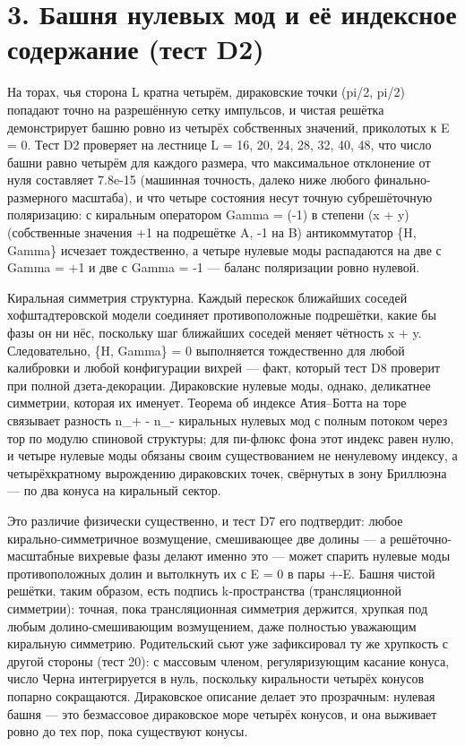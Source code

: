 \documentclass[11pt,a4paper]{article}
\begin{document}
\section{3. Башня нулевых мод и её индексное содержание (тест D2)}
На торах, чья сторона L кратна четырём, дираковские точки (pi/2, pi/2) попадают точно на разрешённую сетку импульсов, и чистая решётка демонстрирует башню ровно из четырёх собственных значений, приколотых к E = 0. Тест D2 проверяет на лестнице L = 16, 20, 24, 28, 32, 40, 48, что число башни равно четырём для каждого размера, что максимальное отклонение от нуля составляет 7.8e-15 (машинная точность, далеко ниже любого финально-размерного масштаба), и что четыре состояния несут точную субрешёточную поляризацию: с киральным оператором Gamma = (-1) в степени (x + y) (собственные значения +1 на подрешётке A, -1 на B) антикоммутатор \{H, Gamma\} исчезает тождественно, а четыре нулевые моды распадаются на две с Gamma = +1 и две с Gamma = -1 --- баланс поляризации ровно нулевой.

Киральная симметрия структурна. Каждый перескок ближайших соседей хофштадтеровской модели соединяет противоположные подрешётки, какие бы фазы он ни нёс, поскольку шаг ближайших соседей меняет чётность x + y. Следовательно, \{H, Gamma\} = 0 выполняется тождественно для любой калибровки и любой конфигурации вихрей --- факт, который тест D8 проверит при полной дзета-декорации. Дираковские нулевые моды, однако, деликатнее симметрии, которая их именует. Теорема об индексе Атия--Ботта на торе связывает разность n\_\allowbreak{}+ - n\_\allowbreak{}- киральных нулевых мод с полным потоком через тор по модулю спиновой структуры; для пи-флюкс фона этот индекс равен нулю, и четыре нулевые моды обязаны своим существованием не ненулевому индексу, а четырёхкратному вырождению дираковских точек, свёрнутых в зону Бриллюэна --- по два конуса на киральный сектор.

Это различие физически существенно, и тест D7 его подтвердит: любое кирально-симметричное возмущение, смешивающее две долины --- а решёточно-масштабные вихревые фазы делают именно это --- может спарить нулевые моды противоположных долин и вытолкнуть их с E = 0 в пары +-E. Башня чистой решётки, таким образом, есть подпись k-пространства (трансляционной симметрии): точная, пока трансляционная симметрия держится, хрупкая под любым долино-смешивающим возмущением, даже полностью уважающим киральную симметрию. Родительский сьют уже зафиксировал ту же хрупкость с другой стороны (тест 20): с массовым членом, регуляризующим касание конуса, число Черна интегрируется в нуль, поскольку киральности четырёх конусов попарно сокращаются. Дираковское описание делает это прозрачным: нулевая башня --- это безмассовое дираковское море четырёх конусов, и она выживает ровно до тех пор, пока существуют конусы.
\end{document}
